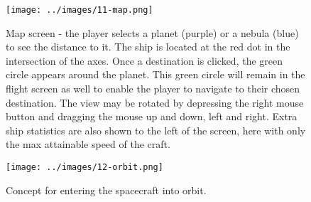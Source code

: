 \begin{figure}[H]
  \centering
  \texttt{[image: ../images/11-map.png]}
  \caption{Map screen - the player selects a planet (purple) or a nebula (blue) to see the distance to it.  The ship is located at the red dot in the intersection of the axes.  Once a destination is clicked, the green circle appears around the planet.  This green circle will remain in the flight screen as well to enable the player to navigate to their chosen destination.  The view may be rotated by depressing the right mouse button and dragging the mouse up and down, left and right.  Extra ship statistics are also shown to the left of the screen, here with only the max attainable speed of the craft.}
\end{figure}

\begin{figure}[H]
  \centering
  \texttt{[image: ../images/12-orbit.png]}
  \caption{Concept for entering the spacecraft into orbit.}
\end{figure}





